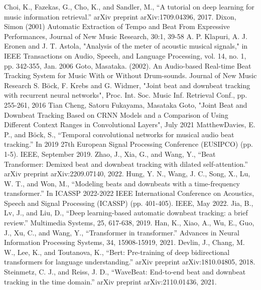 \documentclass[conference]{IEEEtran}
\begin{document}

\begin{thebibliography}{00}
 Choi, K., Fazekas, G., Cho, K., and Sandler, M., ``A tutorial on deep learning for music information retrieval.'' arXiv preprint arXiv:1709.04396, 2017.
 Dixon, Simon (2001) Automatic Extraction of Tempo and Beat From Expressive Performances, Journal of New Music Research, 30:1, 39-58
 A. P. Klapuri, A. J. Eronen and J. T. Astola, "Analysis of the meter of acoustic musical signals," in IEEE Transactions on Audio, Speech, and Language Processing, vol. 14, no. 1, pp. 342-355, Jan. 2006
 Goto, Masataka. (2002). An Audio-based Real-time Beat Tracking System for Music With or Without Drum-sounds. Journal of New Music Research
 S. Böck, F. Krebs and G. Widmer, "Joint beat and downbeat tracking with recurrent neural networks", Proc. Int. Soc. Music Inf. Retrieval Conf., pp. 255-261, 2016
 Tian Cheng, Satoru Fukayama, Masataka Goto, "Joint Beat and Downbeat Tracking Based on CRNN Models and a Comparison
of Using Different Context Ranges in Convolutional Layers", July 2021
 MatthewDavies, E. P., and Böck, S., ``Temporal convolutional networks for musical audio beat tracking.'' In 2019 27th European Signal Processing Conference (EUSIPCO) (pp. 1-5). IEEE, September 2019.
  Zhao, J., Xia, G., and Wang, Y., ``Beat Transformer: Demixed beat and downbeat tracking with dilated self-attention.'' arXiv preprint arXiv:2209.07140, 2022.
 Hung, Y. N., Wang, J. C., Song, X., Lu, W. T., and Won, M., ``Modeling beats and downbeats with a time-frequency transformer.'' In ICASSP 2022-2022 IEEE International Conference on Acoustics, Speech and Signal Processing (ICASSP) (pp. 401-405). IEEE, May 2022.
 Jia, B., Lv, J., and Liu, D., ``Deep learning-based automatic downbeat tracking: a brief review.'' Multimedia Systems, 25, 617-638, 2019.
 Han, K., Xiao, A., Wu, E., Guo, J., Xu, C., and Wang, Y., ``Transformer in transformer.'' Advances in Neural Information Processing Systems, 34, 15908-15919, 2021.
 Devlin, J., Chang, M. W., Lee, K., and Toutanova, K., ``Bert: Pre-training of deep bidirectional transformers for language understanding.'' arXiv preprint arXiv:1810.04805, 2018.
 Steinmetz, C. J., and Reiss, J. D., ``WaveBeat: End-to-end beat and downbeat tracking in the time domain.'' arXiv preprint arXiv:2110.01436, 2021.

\end{thebibliography}
\end{document}
